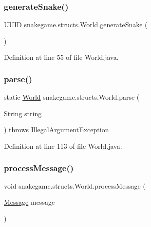 \subsubsection{\texorpdfstring{generate\+Snake()}{generateSnake()}}
{\footnotesize\ttfamily U\+U\+ID snakegame.\+structs.\+World.\+generate\+Snake (\begin{DoxyParamCaption}{ }\end{DoxyParamCaption})}



Definition at line 55 of file World.\+java.

\mbox{\label{classsnakegame_1_1structs_1_1_world_ab8c00c8a748680c55739b31c51d50af5}} 
\subsubsection{\texorpdfstring{parse()}{parse()}}
{\footnotesize\ttfamily static \mbox{\hyperlink{classsnakegame_1_1structs_1_1_world}{World}} snakegame.\+structs.\+World.\+parse (\begin{DoxyParamCaption}\item[{String}]{string }\end{DoxyParamCaption}) throws Illegal\+Argument\+Exception\hspace{0.3cm}{\ttfamily [static]}}



Definition at line 113 of file World.\+java.

\mbox{\label{classsnakegame_1_1structs_1_1_world_aa60efdc485c049d8011fb6c50feead00}} 
\subsubsection{\texorpdfstring{process\+Message()}{processMessage()}}
{\footnotesize\ttfamily void snakegame.\+structs.\+World.\+process\+Message (\begin{DoxyParamCaption}\item[{\mbox{\hyperlink{classsnakegame_1_1server_1_1_message}{Message}}}]{message }\end{DoxyParamCaption})}



